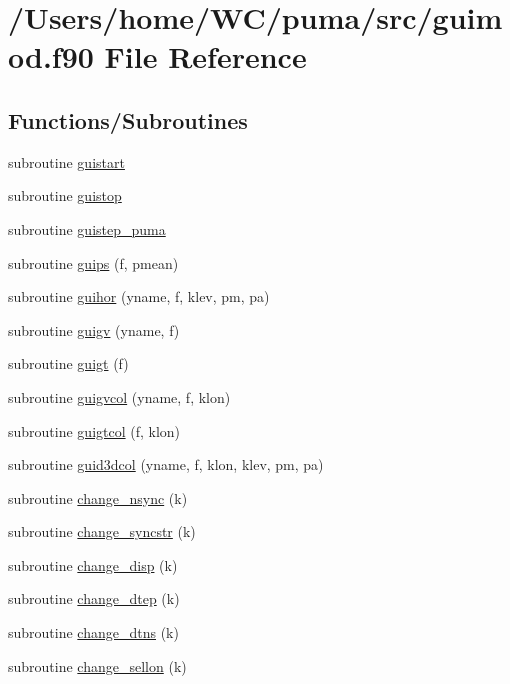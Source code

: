 \hypertarget{guimod_8f90}{
\section{/\-Users/home/\-W\-C/puma/src/guimod.f90 \-File \-Reference}
\label{guimod_8f90}
}
\subsection*{\-Functions/\-Subroutines}
\begin{DoxyCompactItemize}
\item 
subroutine \hyperlink{guimod_8f90_a77235ccfbc718d5f8b1edc4be08aed03}{guistart}
\item 
subroutine \hyperlink{guimod_8f90_ad58ecd458338fd5891f0838eda94bb0c}{guistop}
\item 
subroutine \hyperlink{guimod_8f90_a71eb8e326967dca8aad8bc84d9f8ad72}{guistep\-\_\-puma}
\item 
subroutine \hyperlink{guimod_8f90_aef8771e5b34f33e37c1370ac60c41aea}{guips} (f, pmean)
\item 
subroutine \hyperlink{guimod_8f90_a5fb6afdefec3591f4c43bc2af44ebe46}{guihor} (yname, f, klev, pm, pa)
\item 
subroutine \hyperlink{guimod_8f90_ad4f84b3b48dfc55519b6072ba9a62e97}{guigv} (yname, f)
\item 
subroutine \hyperlink{guimod_8f90_a043a85f7d43cabc1814465b055b8da18}{guigt} (f)
\item 
subroutine \hyperlink{guimod_8f90_a249e53720a2c0cb09cd60f233c4d05e2}{guigvcol} (yname, f, klon)
\item 
subroutine \hyperlink{guimod_8f90_ace8d43f22cbf7e40a53710e26c358bb6}{guigtcol} (f, klon)
\item 
subroutine \hyperlink{guimod_8f90_a5fe23cf66c00091432f98e9338cc4eee}{guid3dcol} (yname, f, klon, klev, pm, pa)
\item 
subroutine \hyperlink{guimod_8f90_a9cdcbb914041a07e5a9c69532ed73f29}{change\-\_\-nsync} (k)
\item 
subroutine \hyperlink{guimod_8f90_a18cd245f5484e061fd59c6d0ce976283}{change\-\_\-syncstr} (k)
\item 
subroutine \hyperlink{guimod_8f90_ae0cea97804c2be7b7859c380dd257af8}{change\-\_\-disp} (k)
\item 
subroutine \hyperlink{guimod_8f90_a516b90b9b073743e6bc5b0ab88a9d24a}{change\-\_\-dtep} (k)
\item 
subroutine \hyperlink{guimod_8f90_afb9135ea9ab544baed4b985f22d7c48c}{change\-\_\-dtns} (k)
\item 
subroutine \hyperlink{guimod_8f90_ab102930c8ece1efffa94e47fe5273134}{change\-\_\-sellon} (k)
\end{DoxyCompactItemize}


